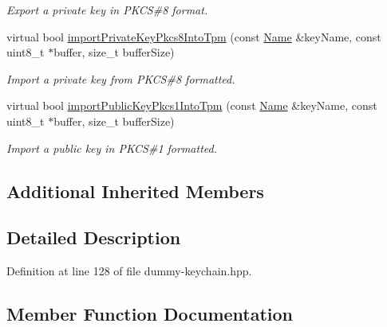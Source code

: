 \begin{DoxyCompactItemize}
\begin{DoxyCompactList}\small\item\em Export a private key in P\+K\+CS\#8 format. \end{DoxyCompactList}\item 
virtual bool \hyperlink{classndn_1_1security_1_1DummyTpm_afc436132a8d66b2cef8fdfb76ad8b870}{import\+Private\+Key\+Pkcs8\+Into\+Tpm} (const \hyperlink{classndn_1_1Name}{Name} \&key\+Name, const uint8\+\_\+t $\ast$buffer, size\+\_\+t buffer\+Size)
\begin{DoxyCompactList}\small\item\em Import a private key from P\+K\+CS\#8 formatted. \end{DoxyCompactList}\item 
virtual bool \hyperlink{classndn_1_1security_1_1DummyTpm_ac70b4ecc135d220381e84661d5929ff5}{import\+Public\+Key\+Pkcs1\+Into\+Tpm} (const \hyperlink{classndn_1_1Name}{Name} \&key\+Name, const uint8\+\_\+t $\ast$buffer, size\+\_\+t buffer\+Size)
\begin{DoxyCompactList}\small\item\em Import a public key in P\+K\+CS\#1 formatted. \end{DoxyCompactList}\end{DoxyCompactItemize}
\subsection*{Additional Inherited Members}


\subsection{Detailed Description}


Definition at line 128 of file dummy-\/keychain.\+hpp.



\subsection{Member Function Documentation}
